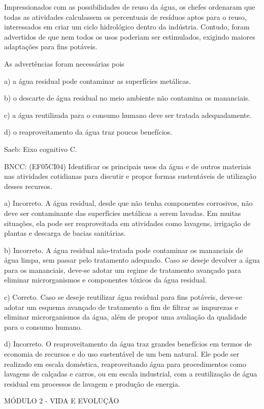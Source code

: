 Impressionados com as possibilidades de reuso da água, os chefes
ordenaram que todas as atividades calculassem os percentuais de resíduos
aptos para o reuso, interessados em criar um ciclo hidrológico dentro da
indústria. Contudo, foram advertidos de que nem todos os usos poderiam
ser estimulados, exigindo maiores adaptações para fins potáveis.

As advertências foram necessárias pois

a) a água residual pode contaminar as superfícies metálicas.

b) o descarte de água residual no meio ambiente não contamina os
mananciais.

c) a água reutilizada para o consumo humano deve ser tratada
adequadamente.

d) o reaproveitamento da água traz poucos benefícios.

Saeb: Eixo cognitivo C.

BNCC: (EF05CI04) Identificar os principais usos da água e de outros
materiais nas atividades cotidianas para discutir e propor formas
sustentáveis de utilização desses recursos.

a) Incorreto. A água residual, desde que não tenha componentes
corrosivos, não deve ser contaminante das superfícies metálicas a serem
lavadas. Em muitas situações, ela pode ser reaproveitada em atividades
como lavagens, irrigação de plantas e descarga de bacias sanitárias.

b) Incorreto. A água residual não-tratada pode contaminar os mananciais
de água limpa, sem passar pelo tratamento adequado. Caso se deseje
devolver a água para os mananciais, deve-se adotar um regime de
tratamento avançado para eliminar microrganismos e componentes tóxicos
da água residual.

c) Correto. Caso se deseje reutilizar água residual para fins potáveis,
deve-se adotar um esquema avançado de tratamento a fim de filtrar as
impurezas e eliminar microrganismos da água, além de propor uma
avaliação da qualidade para o consumo humano.

d) Incorreto. O reaproveitamento da água traz grandes benefícios em
termos de economia de recursos e do uso sustentável de um bem natural.
Ele pode ser realizado em escala doméstica, reaproveitando água para
procedimentos como lavagens de calçadas e carros, ou em escala
industrial, com a reutilização de água residual em processos de lavagem
e produção de energia.

\protect\hypertarget{_ww729jtveegs}{}{}MÓDULO 2 - VIDA E EVOLUÇÃO

